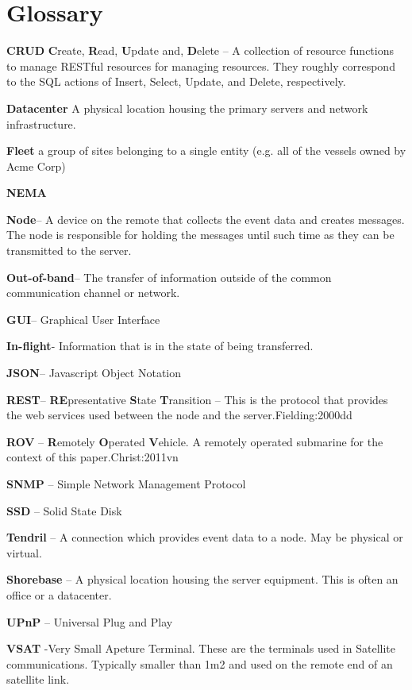 \chapter{Glossary}
\textbf{CRUD}        \textbf{C}reate, \textbf{R}ead, \textbf{U}pdate and, \textbf{D}elete – A collection of resource functions to manage RESTful resources for managing resources. They roughly correspond to the SQL actions of Insert, Select, Update, and Delete, respectively.

\textbf{Datacenter} A physical location housing the primary servers and network infrastructure.

\textbf{Fleet} a group of sites belonging to a single entity (e.g. all of the vessels owned  by Acme Corp)

\textbf{NEMA}        

\textbf{Node}– A device on the remote that collects the event data and creates messages. The node is responsible for holding the messages until such time as they can be transmitted to the server.

\textbf{Out-of-band}– The transfer of information outside of the common communication channel or network.

\textbf{GUI}– Graphical User Interface

\textbf{In-flight}- Information that is in the state of being transferred.

\textbf{JSON}– Javascript Object Notation

\textbf{REST}– \textbf{RE}presentative \textbf{S}tate \textbf{T}ransition – This is the protocol that provides the web services used between the node and the server.{Fielding:2000dd}

\textbf{ROV} – \textbf{R}emotely \textbf{O}perated \textbf{V}ehicle. A remotely operated submarine for the context of this paper.{Christ:2011vn}

\textbf{SNMP} – Simple Network Management Protocol

\textbf{SSD} – Solid State Disk

\textbf{Tendril} – A connection which provides event data to a node. May be physical or virtual.

\textbf{Shorebase} – A physical location housing the server equipment. This is often an office or a datacenter.

\textbf{UPnP} – Universal Plug and Play

\textbf{VSAT}	-Very Small Apeture Terminal. These are the terminals used in Satellite communications. Typically smaller than 1m2 and used on the remote end of an satellite link.
